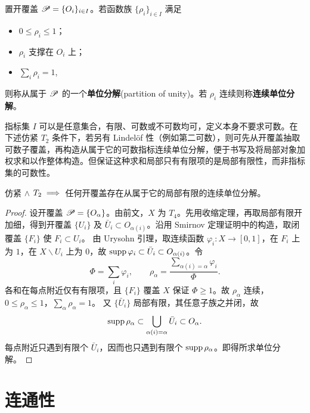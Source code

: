 \begin{definition}
    置开覆盖 $\mathscr P=\{O_i\}_{i\in I}$。若函数族 $\{\rho_i\}_{i\in I}$ 满足
    \begin{itemize}
        \item $0\leqslant\rho_i\leqslant 1$；
        \item $\rho_i$ 支撑在 $O_i$ 上；
        \item $\sum_i \rho_i=1$,
    \end{itemize}
    则称从属于 $\mathscr P$ 的一个\textbf{单位分解}(partition of unity)。若 $\rho_i$ 连续则称\textbf{连续单位分解}。
\end{definition}

\begin{remark}
    指标集 $I$ 可以是任意集合，有限、可数或不可数均可，定义本身不要求可数。在下述仿紧 $T_2$ 条件下，若另有 Lindel\"of 性（例如第二可数），则可先从开覆盖抽取可数子覆盖，再构造从属于它的可数指标连续单位分解，便于书写及将局部对象加权求和以作整体构造。但保证这种求和局部只有有限项的是局部有限性，而非指标集的可数性。
\end{remark}

\begin{theorem}
    仿紧 $\land$ $T_2\implies$ 任何开覆盖存在从属于它的局部有限的连续单位分解。
\end{theorem}
\begin{proof}
    设开覆盖 $\mathscr P=\{O_\alpha\}$。由前文，$X$ 为 $T_4$。先用收缩定理，再取局部有限开加细，得到开覆盖 $\{U_i\}$ 及 $\bar U_i\subset O_{\alpha(i)}$。沿用 Smirnov 定理证明中的构造，取闭覆盖 $\{F_i\}$ 使 $F_i\subset U_i$。
    由 Urysohn 引理，取连续函数 $\varphi_i:X\to[0,1]$，在 $F_i$ 上为 $1$，在 $X\backslash U_i$ 上为 $0$，故 $\operatorname{supp}\varphi_i\subset\bar U_i\subset O_{\alpha(i)}$。令
    \[
        \Phi=\sum_i\varphi_i,\qquad
        \rho_\alpha=\frac{\sum_{\alpha(i)=\alpha}\varphi_i}{\Phi}.
    \]
    各和在每点附近仅有有限项，且 $\{F_i\}$ 覆盖 $X$ 保证 $\Phi\geqslant1$。故 $\rho_\alpha$ 连续，$0\leqslant\rho_\alpha\leqslant1$，$\sum_\alpha\rho_\alpha=1$。
    又 $\{\bar U_i\}$ 局部有限，其任意子族之并闭，故
    \[
        \operatorname{supp}\rho_\alpha\subset\bigcup_{\alpha(i)=\alpha}\bar U_i\subset O_\alpha.
    \]
    每点附近只遇到有限个 $\bar U_i$，因而也只遇到有限个 $\operatorname{supp}\rho_\alpha$。即得所求单位分解。
\end{proof}


\section{连通性}

